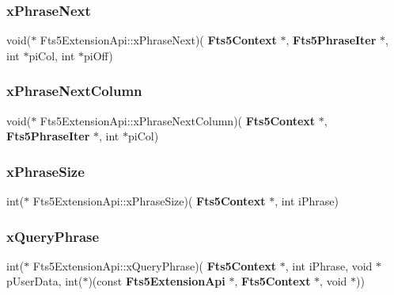 \mbox{\label{struct_fts5_extension_api_a049c7163a39f20c675cf261fa181a9a1}} 
\subsubsection{xPhraseNext}
{\footnotesize\ttfamily void($\ast$ Fts5\+Extension\+Api\+::x\+Phrase\+Next)(\textbf{ Fts5\+Context} $\ast$, \textbf{ Fts5\+Phrase\+Iter} $\ast$, int $\ast$pi\+Col, int $\ast$pi\+Off)}

\mbox{\label{struct_fts5_extension_api_aab6694c0e06fc2a5ecca0041a492f2b1}} 
\subsubsection{xPhraseNextColumn}
{\footnotesize\ttfamily void($\ast$ Fts5\+Extension\+Api\+::x\+Phrase\+Next\+Column)(\textbf{ Fts5\+Context} $\ast$, \textbf{ Fts5\+Phrase\+Iter} $\ast$, int $\ast$pi\+Col)}

\mbox{\label{struct_fts5_extension_api_a35442bdd54fd59f3a0d0eab74df50571}} 
\subsubsection{xPhraseSize}
{\footnotesize\ttfamily int($\ast$ Fts5\+Extension\+Api\+::x\+Phrase\+Size)(\textbf{ Fts5\+Context} $\ast$, int i\+Phrase)}

\mbox{\label{struct_fts5_extension_api_a66af7d07783c18b2c59025f982b2bd92}} 
\subsubsection{xQueryPhrase}
{\footnotesize\ttfamily int($\ast$ Fts5\+Extension\+Api\+::x\+Query\+Phrase)(\textbf{ Fts5\+Context} $\ast$, int i\+Phrase, void $\ast$p\+User\+Data, int($\ast$)(const \textbf{ Fts5\+Extension\+Api} $\ast$, \textbf{ Fts5\+Context} $\ast$, void $\ast$))}

\mbox{\label{struct_fts5_extension_api_a7f82e336e97540cb7efb66bd27042e4f}} 
